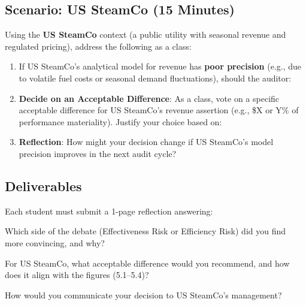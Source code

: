 \documentclass[12pt,a4paper]{memoir}
\begin{document}
\subsection*{Scenario: US SteamCo (15 Minutes)}
Using the \textbf{US SteamCo} context (a public utility with seasonal revenue and regulated pricing), address the following as a class:

\begin{enumerate}
    \item If US SteamCo’s analytical model for revenue has \textbf{poor precision} (e.g., due to volatile fuel costs or seasonal demand fluctuations), should the auditor:

    \item \textbf{Decide on an Acceptable Difference}:
    As a class, vote on a specific acceptable difference for US SteamCo’s revenue assertion (e.g., \$X or Y\% of performance materiality). Justify your choice based on:

    \item \textbf{Reflection}: How might your decision change if US SteamCo’s model precision improves in the next audit cycle?
\end{enumerate}

\subsection*{Deliverables}
Each student must submit a 1-page reflection answering:
\begin{compactitem}
    \item Which side of the debate (Effectiveness Risk or Efficiency Risk) did you find more convincing, and why?
    \item For US SteamCo, what acceptable difference would you recommend, and how does it align with the figures (5.1–5.4)?
    \item How would you communicate your decision to US SteamCo’s management?
\end{compactitem}
\end{document}
